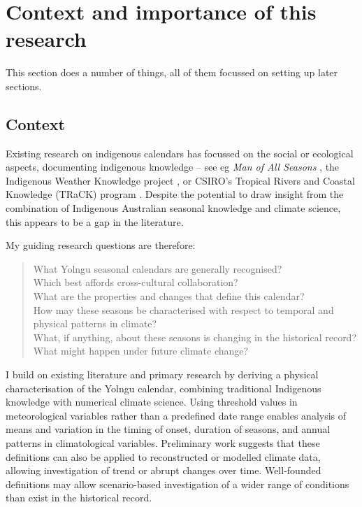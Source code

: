 \chapter{Context and importance of this research}
This section does a number of things, all of them focussed on setting up later sections.

\section{Context}

Existing research on indigenous calendars has focussed on the social or ecological aspects, documenting indigenous knowledge –
see eg \textit{Man of All Seasons} \citep{davis1989}, the Indigenous Weather Knowledge project \citet{BOM-iwk}, or
CSIRO’s Tropical Rivers and Coastal Knowledge (TRaCK) program \citep{CSIROcals,oconnor2010}.
Despite the potential to draw insight from the combination of Indigenous Australian seasonal knowledge and climate science, this appears to be a gap in the literature.

My guiding research questions are therefore:
\blockquote{
What Yolngu seasonal calendars are generally recognised?\\
Which best affords cross-cultural collaboration?\\
What are the properties and changes that define this calendar?\\
How may these seasons be characterised with respect to temporal and physical patterns in climate?\\
What, if anything, about these seasons is changing in the historical record?\\
What might happen under future climate change?\\
}

I build on existing literature and primary research by deriving a physical characterisation of the Yolngu calendar,
combining traditional Indigenous knowledge with numerical climate science.
Using threshold values in meteorological variables rather than a predefined date range enables
analysis of means and variation in the timing of onset, duration of seasons, and annual patterns in climatological variables.
Preliminary work suggests that these definitions can also be applied to reconstructed or modelled climate data,
allowing investigation of trend or abrupt changes over time.
Well-founded definitions may allow scenario-based investigation of a wider range of conditions than exist in the historical record.


